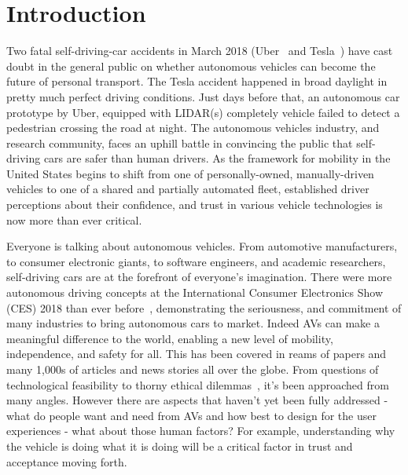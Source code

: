 \section{Introduction}
\label{sec:introduction}


Two fatal self-driving-car accidents in March 2018 (Uber~\cite{uber} and Tesla~\cite{tesla}) have cast doubt in the general public on whether autonomous vehicles can become the future of personal transport. 
The Tesla accident happened in broad daylight in pretty much perfect driving conditions. Just days before that, an autonomous car prototype by Uber, equipped with LIDAR(s) completely vehicle failed to detect a pedestrian crossing the road at night. 
The autonomous vehicles industry, and research community, faces an uphill battle in convincing the public that self-driving cars are safer than human drivers.
As the framework for mobility in the United States begins to shift from one of personally-owned, manually-driven vehicles to one of a shared and partially automated fleet, established driver perceptions about their confidence, and trust in various vehicle technologies is now more than ever critical.

Everyone is talking about autonomous vehicles. 
From automotive manufacturers, to consumer electronic giants, to software engineers, and academic researchers, self-driving cars are at the forefront of everyone’s imagination. 
There were more autonomous driving concepts at the International Consumer Electronics Show (CES) 2018 than ever before~\cite{techcrunch_2018}, demonstrating the seriousness, and commitment of many industries to bring autonomous cars to market.
Indeed AVs can make a meaningful difference to the world, enabling a new level of mobility, independence, and safety for all. 
This has been covered in reams of papers and many 1,000s of articles and news stories all over the globe. 
From questions of technological feasibility to thorny ethical dilemmas~\cite{lin2016ethics}, it’s been approached from many angles.
However there are aspects that haven’t yet been fully addressed - what do people want and need from AVs and how best to design for the user experiences - what about those human factors?
For example, understanding why the vehicle is doing what it is doing will be a critical factor in trust and acceptance moving forth.


